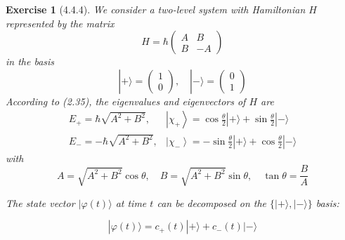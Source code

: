 \documentclass[12pt]{article}
\newtheorem{exercise}{Exercise}
\begin{document}
	\begin{exercise}[4.4.4]
		We consider a two-level system with Hamiltonian $H$ represented by the matrix
		$$
		H=\hbar\left(\begin{array}{cc}
			A & B \\
			B & -A
		\end{array}\right)
		$$
		in the basis
		$$
		|+\rangle=\left(\begin{array}{l}
			1 \\
			0
		\end{array}\right), \quad|-\rangle=\left(\begin{array}{l}
			0 \\
			1
		\end{array}\right)
		$$
		According to (2.35), the eigenvalues and eigenvectors of $H$ are
		$$
		\begin{array}{ll}
			E_{+}=\hbar \sqrt{A^{2}+B^{2}}, & \left|\chi_{+}\right\rangle=\cos \frac{\theta}{2}|+\rangle+\sin \frac{\theta}{2}|-\rangle \\
			E_{-}=-\hbar \sqrt{A^{2}+B^{2}}, & \left|\chi_{-}\right\rangle=-\sin \frac{\theta}{2}|+\rangle+\cos \frac{\theta}{2}|-\rangle
		\end{array}
		$$
		with
		$$
		A=\sqrt{A^{2}+B^{2}} \cos \theta, \quad B=\sqrt{A^{2}+B^{2}} \sin \theta, \quad \tan \theta=\frac{B}{A}
		$$
		\begin{exercises}
		\item The state vector $|\varphi(t)\rangle$ at time $t$ can be decomposed on the $\{|+\rangle,|-\rangle\}$ basis:
		
		$$
		|\varphi(t)\rangle=c_{+}(t)|+\rangle+c_{-}(t)|-\rangle
		$$
		

\end{exercises}
\end{exercise}
\end{document}
